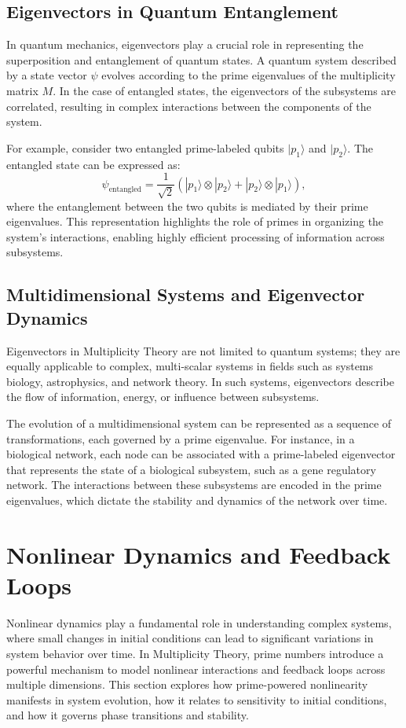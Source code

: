 \documentclass[%
 preprint, linenumbers,
 amsmath,amssymb,
 aps, physrev,
]{revtex4-2}
\begin{document}
\subsection{Eigenvectors in Quantum Entanglement}

In quantum mechanics, eigenvectors play a crucial role in representing the superposition and entanglement of quantum states. A quantum system described by a state vector \( \psi \) evolves according to the prime eigenvalues of the multiplicity matrix \( M \). In the case of entangled states, the eigenvectors of the subsystems are correlated, resulting in complex interactions between the components of the system.

For example, consider two entangled prime-labeled qubits \( | p_1 \rangle \) and \( | p_2 \rangle \). The entangled state can be expressed as:
\[
\psi_{\text{entangled}} = \frac{1}{\sqrt{2}} \left( | p_1 \rangle \otimes | p_2 \rangle + | p_2 \rangle \otimes | p_1 \rangle \right),
\]
where the entanglement between the two qubits is mediated by their prime eigenvalues. This representation highlights the role of primes in organizing the system's interactions, enabling highly efficient processing of information across subsystems.

\subsection{Multidimensional Systems and Eigenvector Dynamics}

Eigenvectors in Multiplicity Theory are not limited to quantum systems; they are equally applicable to complex, multi-scalar systems in fields such as systems biology, astrophysics, and network theory. In such systems, eigenvectors describe the flow of information, energy, or influence between subsystems.

The evolution of a multidimensional system can be represented as a sequence of transformations, each governed by a prime eigenvalue. For instance, in a biological network, each node can be associated with a prime-labeled eigenvector that represents the state of a biological subsystem, such as a gene regulatory network. The interactions between these subsystems are encoded in the prime eigenvalues, which dictate the stability and dynamics of the network over time.

\section{Nonlinear Dynamics and Feedback Loops}
Nonlinear dynamics play a fundamental role in understanding complex systems, where small changes in initial conditions can lead to significant variations in system behavior over time. In Multiplicity Theory, prime numbers introduce a powerful mechanism to model nonlinear interactions and feedback loops across multiple dimensions. This section explores how prime-powered nonlinearity manifests in system evolution, how it relates to sensitivity to initial conditions, and how it governs phase transitions and stability.
\end{document}
